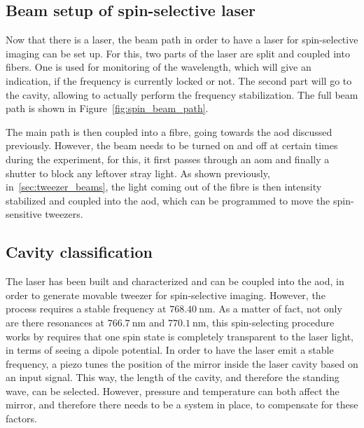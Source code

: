 \subsection{Beam setup of spin-selective laser}

Now that there is a laser, the beam path in order to have a laser for spin-selective imaging can be set up. For this, two parts of the laser are split and coupled into fibers. One is used for monitoring of the wavelength, which will give an indication, if the frequency is currently locked or not. The second part will go to the cavity, allowing to actually perform the frequency stabilization. The full beam path is shown in Figure~\ref{fig:spin_beam_path}.

\begin{figure}[tbp]%
\end{figure}

The main path is then coupled into a fibre, going towards the \ac{aod} discussed previously. However, the beam needs to be turned on and off at certain times during the experiment, for this, it first passes through an \ac{aom} and finally a shutter to block any leftover stray light. As shown previously, in~\ref{sec:tweezer_beams}, the light coming out of the fibre is then intensity stabilized and coupled into the \ac{aod}, which can be programmed to move the spin-sensitive tweezers.

\subsection{Cavity classification}

The laser has been built and characterized and can be coupled into the \ac{aod}, in order to generate movable tweezer for spin-selective imaging. However, the process requires a stable frequency at $\SI{768.40}{\nano\meter}$. As a matter of fact, not only are there resonances at $\SI{766.7}{\nano\meter}$ and $\SI{770.1}{\nano\meter}$, this spin-selecting procedure works by requires that one spin state is completely transparent to the laser light, in terms of seeing a dipole potential. In order to have the laser emit a stable frequency, a piezo tunes the position of the mirror inside the laser cavity based on an input signal. This way, the length of the cavity, and therefore the standing wave, can be selected. However, pressure and temperature can both affect the mirror, and therefore there needs to be a system in place, to compensate for these factors.

